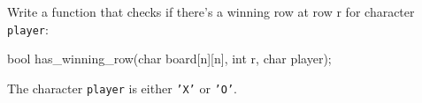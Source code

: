 \begin{ex}
Write a function that checks if there's a winning row at row r for character \texttt{player}:

\begin{consolethree}
bool has_winning_row(char board[n][n], int r, char player);
\end{consolethree}

The character \texttt{player} is either \texttt{'X'} or \texttt{'O'}.
\end{ex}

